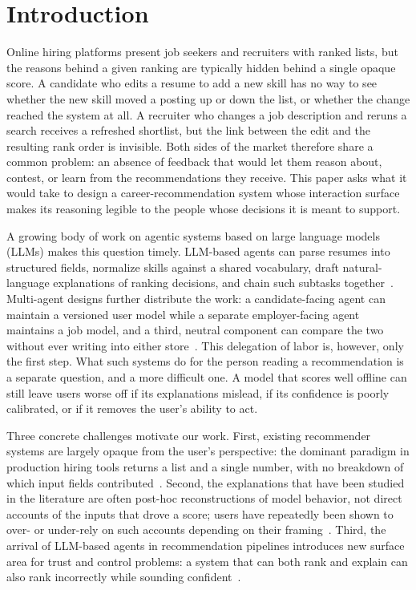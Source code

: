 \section{Introduction}\label{sec:1}

Online hiring platforms present job seekers and recruiters with ranked lists, but the reasons behind a given ranking are typically hidden behind a single opaque score.
A candidate who edits a resume to add a new skill has no way to see whether the new skill moved a posting up or down the list, or whether the change reached the system at all.
A recruiter who changes a job description and reruns a search receives a refreshed shortlist, but the link between the edit and the resulting rank order is invisible.
Both sides of the market therefore share a common problem: an absence of feedback that would let them reason about, contest, or learn from the recommendations they receive.
This paper asks what it would take to design a career-recommendation system whose interaction surface makes its reasoning legible to the people whose decisions it is meant to support.

A growing body of work on agentic systems based on large language models (LLMs) makes this question timely.
LLM-based agents can parse resumes into structured fields, normalize skills against a shared vocabulary, draft natural-language explanations of ranking decisions, and chain such subtasks together~\cite{wei2022chain,yao2023react,schick2023toolformer,xi2023rise,sumers2024cognitive}.
Multi-agent designs further distribute the work: a candidate-facing agent can maintain a versioned user model while a separate employer-facing agent maintains a job model, and a third, neutral component can compare the two without ever writing into either store~\cite{li2023camel,qian2023communicative,shen2023hugginggpt,rosenfeld2019HAS}.
This delegation of labor is, however, only the first step.
What such systems do for the person reading a recommendation is a separate question, and a more difficult one.
A model that scores well offline can still leave users worse off if its explanations mislead, if its confidence is poorly calibrated, or if it removes the user's ability to act.

Three concrete challenges motivate our work.
First, existing recommender systems are largely opaque from the user's perspective: the dominant paradigm in production hiring tools returns a list and a single number, with no breakdown of which input fields contributed~\cite{jannach2021recsys,tintarev2015explaining}.
Second, the explanations that have been studied in the literature are often post-hoc reconstructions of model behavior, not direct accounts of the inputs that drove a score; users have repeatedly been shown to over- or under-rely on such accounts depending on their framing~\cite{miller2019explanation,liao2020questioning,joshi2021real}.
Third, the arrival of LLM-based agents in recommendation pipelines introduces new surface area for trust and control problems: a system that can both rank and explain can also rank incorrectly while sounding confident~\cite{lin2022exploring}.

